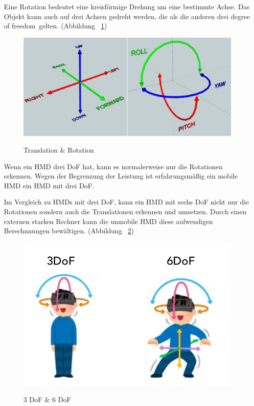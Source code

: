   Eine Rotation bedeutet eine kreisförmige Drehung um eine bestimmte Achse. Das Objekt kann auch auf drei Achsen gedreht werden, die als die anderen drei \glqq degree of freedom\grqq\ gelten. (Abbildung ~\ref{fig:translationRotation})

\begin{figure}[ht]
\vspace*{1em}
\centering
\caption{Translation \& Rotation}
\includegraphics[width=\textwidth]{images/translationRotation.png}
\label{fig:translationRotation} 
\end{figure}
  
  Wenn ein HMD drei DoF hat, kann es normalerweise nur die Rotationen erkennen. Wegen der Begrenzung der Leistung ist erfahrungsmäßig ein mobile HMD ein HMD mit drei DoF.
  
  Im Vergleich zu HMDs mit drei DoF, kann ein HMD mit sechs DoF nicht nur die Rotationen sondern auch die Translationen erkennen und umsetzen. Durch einen externen starken Rechner kann die unmobile HMD diese aufwendigen Berechnnungen bewältigen. (Abbildung ~\ref{fig:6DoF-vs-3DoF})
  
\begin{figure}[ht]
\vspace*{1em}
\centering
\caption{3 DoF \& 6 DoF}
\includegraphics[width=\textwidth]{images/6DoF-vs-3DoF.jpg}
\label{fig:6DoF-vs-3DoF} 
\end{figure}
  

